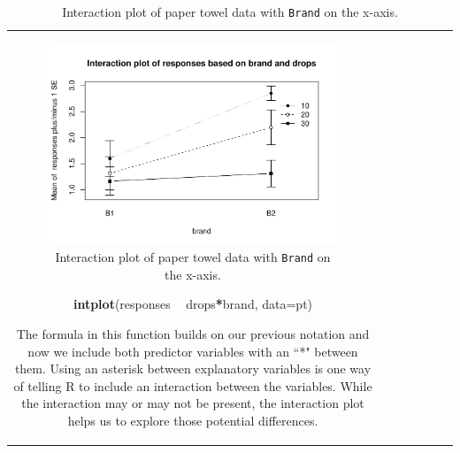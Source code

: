 \documentclass[]{book}
\newenvironment{Shaded}{\begin{snugshade}}{\end{snugshade}}
\newcommand{\KeywordTok}[1]{\textcolor[rgb]{0.13,0.29,0.53}{\textbf{#1}}}
\newcommand{\DataTypeTok}[1]{\textcolor[rgb]{0.13,0.29,0.53}{#1}}
\newcommand{\StringTok}[1]{\textcolor[rgb]{0.31,0.60,0.02}{#1}}
\newcommand{\OperatorTok}[1]{\textcolor[rgb]{0.81,0.36,0.00}{\textbf{#1}}}
\newcommand{\NormalTok}[1]{#1}
\theoremstyle{definition}
\theoremstyle{definition}
\theoremstyle{remark}
\begin{document}
\begin{longtable}[]{@{}ccccccc@{}}
\begin{minipage}[b]{0.10\columnwidth}
\begin{figure}
\centering
\includegraphics{04-twoWayAnova_files/figure-latex/Figure4-3-1.pdf}
\caption{\label{fig:Figure4-3}Interaction plot of paper towel data with \texttt{Brand} on
the x-axis.}
\end{figure}

\begin{Shaded}
\begin{Highlighting}[]
\KeywordTok{intplot}\NormalTok{(responses }\OperatorTok{~}\StringTok{ }\NormalTok{drops}\OperatorTok{*}\NormalTok{brand, }\DataTypeTok{data=}\NormalTok{pt)}
\end{Highlighting}
\end{Shaded}

The formula in this function builds on our previous notation and now we
include both predictor variables with an ``*" between them. Using an
asterisk between explanatory variables is one way of telling R to
include an interaction between the variables. While the interaction may
or may not be present, the interaction plot helps us to explore those
potential differences.


\end{minipage}
\end{longtable}
\end{document}
